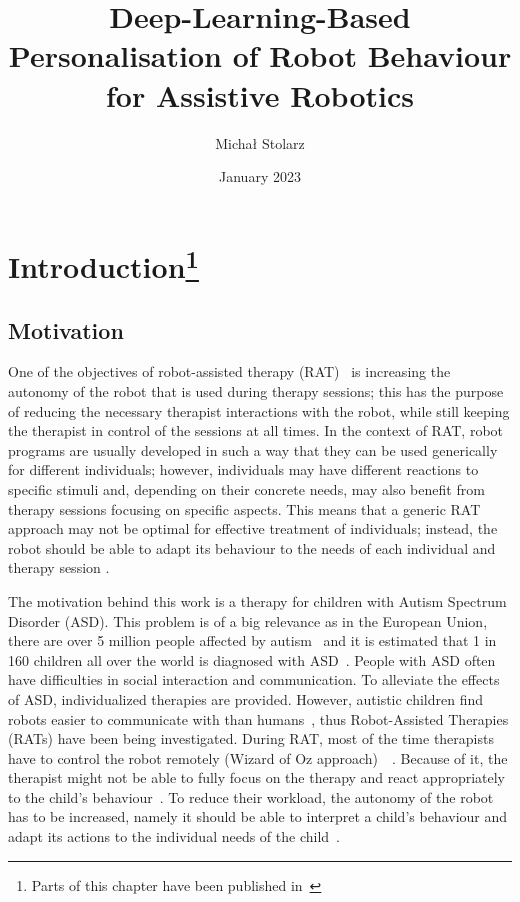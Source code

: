 \documentclass[thesis]{mas_proposal}
\title{Deep-Learning-Based Personalisation of Robot Behaviour for Assistive Robotics}
\author{Michał Stolarz}
\date{January 2023}
\begin{document}
\maketitle

\pagestyle{plain}

\section[Introduction]{Introduction\footnote{Parts of this chapter have been published in~\cite{stolarz2022personalized,stolarz2022learningbased}}}

\subsection{Motivation}
One of the objectives of robot-assisted therapy (RAT)~\cite{esteban2017build} is increasing the autonomy of the robot that is used during therapy sessions; this has the purpose of reducing the necessary therapist interactions with the robot, while still keeping the therapist in control of the sessions at all times.
In the context of RAT, robot programs are usually developed in such a way that they can be used generically for different individuals; however, individuals may have different reactions to specific stimuli and, depending on their concrete needs, may also benefit from therapy sessions focusing on specific aspects.
This means that a generic RAT approach may not be optimal for effective treatment of individuals; instead, the robot should be able to adapt its behaviour to the needs of each individual and therapy session \cite{esteban2017build,scassellati2018improving,rudovic2018personalized}.

The motivation behind this work is a therapy for children with Autism Spectrum Disorder (ASD). This problem is of a big relevance as in the European Union, there are over 5 million people affected by autism~\cite{deenigma2022} and it is estimated that 1 in 160 children all over the world is diagnosed with ASD~\cite{jain2020modeling}. People with ASD often have difficulties in social interaction and communication. To alleviate the effects of ASD, individualized therapies are provided. However, autistic children find robots easier to communicate with than humans~\cite{robins2006}, thus Robot-Assisted Therapies (RATs) have been being investigated. During RAT, most of the time therapists have to control the robot remotely (Wizard of Oz approach)~\cite{deenigma2022}~\cite{david2018developing,robins2017developing,rudovic2017measuring,marinoiu20183d}. Because of it, the therapist might not be able to fully focus on the therapy and react appropriately to the child's behaviour~\cite{cao2018personalized}. To reduce their workload, the autonomy of the robot has to be increased, namely it should be able to interpret a child’s behaviour and adapt its actions to the individual needs of the child~\cite{esteban2017build}.
\end{document}

